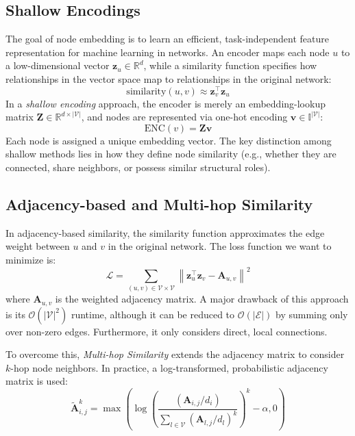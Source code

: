 \subsection{Shallow Encodings}
The goal of node embedding is to learn an efficient, task-independent feature representation for machine learning in networks. An encoder maps each node $u$ to a low-dimensional vector $\mathbf{z}_u \in \mathbb{R}^d$, while a similarity function specifies how relationships in the vector space map to relationships in the original network:
\begin{equation}
    \text{similarity}(u, v) \approx \mathbf{z}_v^\top \mathbf{z}_u
\end{equation}
In a \textit{shallow encoding} approach, the encoder is merely an embedding-lookup matrix $\mathbf{Z} \in \mathbb{R}^{d \times |\mathcal{V}|}$, and nodes are represented via one-hot encoding $\mathbf{v} \in \mathbb{I}^{|\mathcal{V}|}$:
\begin{equation}
    \text{ENC}(v) = \mathbf{Z}\mathbf{v}
\end{equation}
Each node is assigned a unique embedding vector. The key distinction among shallow methods lies in how they define node similarity (e.g., whether they are connected, share neighbors, or possess similar structural roles).

\subsection{Adjacency-based and Multi-hop Similarity}
In adjacency-based similarity, the similarity function approximates the edge weight between $u$ and $v$ in the original network. The loss function we want to minimize is:
\begin{equation}
    \mathcal{L} = \sum_{(u,v) \in \mathcal{V} \times \mathcal{V}} \left\| \mathbf{z}_u^\top \mathbf{z}_v - \mathbf{A}_{u,v} \right\|^2
\end{equation}
where $\mathbf{A}_{u,v}$ is the weighted adjacency matrix. A major drawback of this approach is its $\mathcal{O}(|\mathcal{V}|^2)$ runtime, although it can be reduced to $\mathcal{O}(|\mathcal{E}|)$ by summing only over non-zero edges. Furthermore, it only considers direct, local connections. 

To overcome this, \textit{Multi-hop Similarity} extends the adjacency matrix to consider $k$-hop node neighbors. In practice, a log-transformed, probabilistic adjacency matrix is used:
\begin{equation}
    \tilde{\mathbf{A}}_{i,j}^k = \max \left( \log \left( \frac{(\mathbf{A}_{i,j} / d_i)}{\sum_{l \in \mathcal{V}} (\mathbf{A}_{l,j} / d_l)^k} \right)^k - \alpha, 0 \right)
\end{equation}

